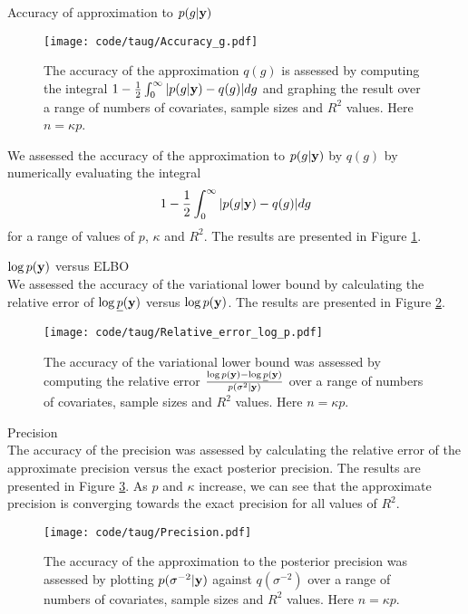 \documentclass{amsart}[12pt]
\begin{document}
Accuracy of approximation to $p(g | {\bf y})$ \\

\begin{figure}[p]
	\texttt{[image: code/taug/Accuracy\_g.pdf]}
	\caption{The accuracy of the approximation $q(g)$ is assessed by computing the integral   $1 -
		\frac{1}{2} \int_0^\infty |p(g | {\bf y}) - q(g)| d g$ and graphing the result over a range
		of numbers of covariates, sample sizes and $R^2$  values. Here $n = \kappa p$.}
	\label{fig:accuracy_g}
\end{figure}

We assessed the accuracy of the approximation to $p(g | {\bf y})$ by $q(g)$ by numerically evaluating the integral
\[
	1 - \frac{1}{2} \int_0^\infty |p(g | {\bf y}) - q(g)| d g
\]
for a range of values of $p$, $\kappa$ and $R^2$. The results are presented in Figure \ref{fig:accuracy_g}.


$\log{p({\bf y})}$ versus ELBO \\

We assessed the accuracy of the variational lower bound by calculating the relative error of
$\log{\underline{p}({\bf y})}$ versus $\log{p({\bf y})}$. The results are presented in Figure
\ref{fig:relative_error}.

\begin{figure}[p]
	\texttt{[image: code/taug/Relative\_error\_log\_p.pdf]}
	\caption{The accuracy of the variational lower bound was assessed by computing the relative error
		$\frac{\log p({\bf y}) - \log \underline{p}({\bf y})}{p(\sigma^2 | {\bf y})}$ over a range
		of numbers of covariates, sample sizes and $R^2$  values. Here $n = \kappa p$.}
	\label{fig:relative_error}
\end{figure}

Precision \\

The accuracy of the precision was assessed by calculating the relative error of the approximate precision
versus the exact posterior precision. The results are presented in Figure \ref{fig:precision}. As $p$ and
$\kappa$ increase, we can see that the approximate precision is converging towards the exact precision for all
values of $R^2$.

\begin{figure}[p]
	\texttt{[image: code/taug/Precision.pdf]}
	\caption{The accuracy of the approximation to the posterior precision was assessed by plotting
		$p(\sigma^{-2} | {\bf y})$ against $q(\sigma^{-2})$ over a range
		of numbers of covariates, sample sizes and $R^2$  values. Here $n = \kappa p$.}
	\label{fig:precision}
\end{figure}
\end{document}
